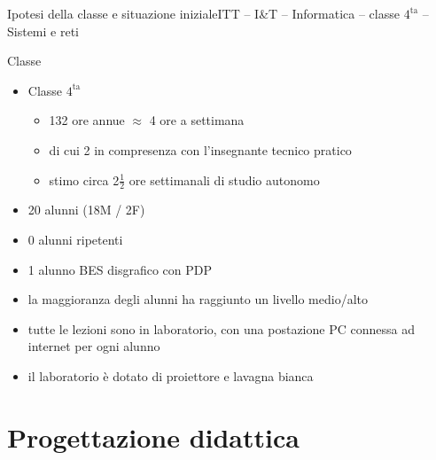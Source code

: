 \documentclass[italian]{beamer}
\begin{document}
\begin{frame}{Ipotesi della classe e situazione iniziale}{ITT -- I\&T -- Informatica -- classe $4^{\text{ta}}$ -- Sistemi e reti}
	
	\begin{block}{Classe}
		\begin{itemize}
			\item Classe $4^{\text{ta}}$
			\begin{itemize}
				\item 132 ore annue $\approx$ 4 ore a settimana
				\item di cui 2 in compresenza con l'insegnante tecnico pratico
				\item stimo circa 2$\frac{1}{2}$ ore settimanali di studio autonomo
			\end{itemize}			
			\item 20 alunni (18M / 2F)
			\item 0 alunni ripetenti
			\item 1 alunno BES disgrafico con PDP 
			\item la maggioranza degli alunni ha raggiunto un livello medio/alto
			\item tutte le lezioni sono in laboratorio, con una postazione PC connessa ad internet per ogni alunno
			\item il laboratorio \`e dotato di proiettore e lavagna bianca
		\end{itemize}
	\end{block}
	
\end{frame}

\section[Progettazione didattica]{Progettazione didattica}
\end{document}
